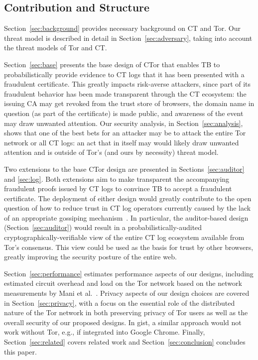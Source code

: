 \subsection{Contribution and Structure}
Section~\ref{sec:background} provides necessary background on CT and Tor. Our
threat model is described in detail in Section~\ref{sec:adversary}, taking into
account the threat models of Tor and CT\@.

Section~\ref{sec:base} presents the base design of CTor that enables TB to
probabilistically provide evidence to CT logs that it has been presented with a
fraudulent certificate. This greatly impacts risk-averse attackers, since part
of its fraudulent behavior has been made transparent through the CT ecosystem:
the issuing CA may get revoked from the trust store of browsers, the domain name
in question (as part of the certificate) is made public, and awareness of the
event may draw unwanted attention. Our security analysis, in
Section~\ref{sec:analysis}, shows that one of the best bets for an attacker may
be to attack the entire Tor network or all CT logs: an act that in itself may
would likely draw unwanted attention and is outside of Tor's (and ours by
necessity) threat model.

Two extensions to the base CTor design are presented in
Sections~\ref{sec:auditor} and \ref{sec:log}. Both extensions aim to make
transparent the accompanying fraudulent proofs issued by CT logs to convince TB
to accept a fraudulent certificate. The deployment of either design would
greatly contribute to the open question of how to reduce trust in CT log
operators currently caused by the lack of an appropriate gossiping
mechanism~\cite{minimal-gossip,nordberg}. In particular, the auditor-based
design (Section~\ref{sec:auditor}) would result in a probabilistically-audited
cryptographically-verifiable view of the entire CT log ecosystem available from
Tor's consensus. This view could be used as the basis for trust by other
browsers, greatly improving the security posture of the entire web.

Section~\ref{sec:performance} estimates performance aspects of our designs,
including estimated circuit overhead and load on the Tor network based on the
network measurements by Mani et al.~\cite{mani}. Privacy aspects of our design
choices are covered in Section~\ref{sec:privacy}, with a focus on the essential
role of the distributed nature of the Tor network in both preserving privacy of
Tor users as well as the overall security of our proposed designs. In gist, a
similar approach would not work without Tor, e.g., if integrated into Google
Chrome. Finally, Section~\ref{sec:related} covers related work and
Section~\ref{sec:conclusion} concludes this paper.

